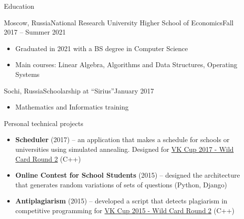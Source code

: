 \documentclass[]{cv/mcdowellcv}
\begin{document}
	\begin{cvsection}{Education}
		\begin{cvsubsection}{Moscow, Russia}{National Research University Higher School of Economics}{Fall 2017 -- Summer 2021}

                    \vskip 0.3cm

			\begin{itemize}
                            \item Graduated in 2021 with a BS degree in Computer Science
                            \item Main courses: Linear Algebra, Algorithms and Data Structures, Operating Systems
			\end{itemize}
		\end{cvsubsection}

                \begin{cvsubsection}{Sochi, Russia}{Schoolarship at ``Sirius''}{January 2017}
                    \begin{itemize}
                        \item Mathematics and Informatics training
                    \end{itemize}
                \end{cvsubsection}

	\end{cvsection}

	\begin{cvsection}{Personal technical projects}
            \vskip 0.1cm
            \begin{cvsubsection}{}{}{}
                    \begin{itemize}
                        \item \textbf{Scheduler} (2017) -- an application that makes a schedule for schools or universities using simulated annealing. Designed for \href{https://codeforces.com/contest/775/problem/A}{VK Cup 2017 - Wild Card Round 2} (C++)
                            \item \textbf{Online Contest for School Students} (2015) -- designed the architecture that generates random variations of sets of questions (Python, Django)
                            \item \textbf{Antiplagiarism} (2015) -- developed a script that detects plagiarism in competitive programming for \href{https://codeforces.com/contest/537/problem/A}{VK Cup 2015 - Wild Card Round 2} (C++)
                    \end{itemize}
            \end{cvsubsection}
	\end{cvsection}
\end{document}
